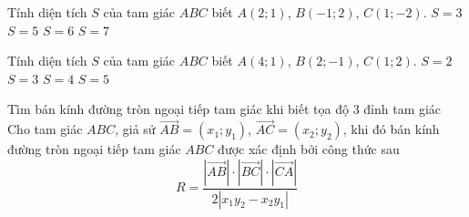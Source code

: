 \begin{vd}%
Tính diện tích $S$ của  tam giác $ABC$ biết $A(2;1)$, $B(-1;2)$, $C(1;-2)$.
\choice
{$S=3$}
{\True $S=5$}
{$S=6$}
{$S=7$}
\end{vd}

\begin{vd}%
Tính diện tích $S$ của  tam giác $ABC$ biết $A(4;1)$, $B(2;-1)$, $C(1;2)$.
\choice
{$S=2$}
{$S=3$}
{\True $S=4$}
{$S=5$}
\end{vd}

\begin{dang}{Tìm bán kính đường tròn ngoại tiếp tam giác khi biết tọa độ $3$ đỉnh tam giác}
	Cho tam giác $ABC$,  giả sử $\overrightarrow{AB} = (x_1;y_1)$, $\overrightarrow{AC} = (x_2;y_2)$, khi đó bán kính đường tròn ngoại tiếp tam giác $ABC$ được xác định bởi công thức sau 
	\[R=\dfrac{\left |\overrightarrow{AB}\right |\cdot \left |\overrightarrow{BC}\right |\cdot \left |\overrightarrow{CA}\right |}{2|x_1y_2-x_2y_1| }\]
\end{dang}

